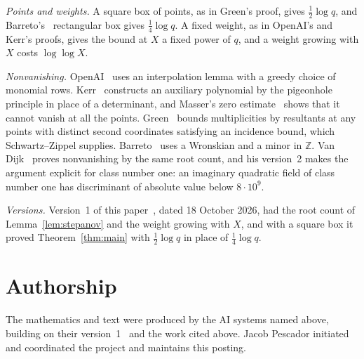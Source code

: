 \documentclass[11pt]{amsart}
\theoremstyle{remark}
\newcommand{\Z}{\mathbb{Z}}
\begin{document}
\emph{Points and weights.} A square box of points, as in Green's proof, gives $\frac12\log q$, and
Barreto's~\cite{Barreto} rectangular box gives $\frac14\log q$. A fixed weight, as in OpenAI's and Kerr's
proofs, gives the bound at $X$ a fixed power of $q$, and a weight growing with $X$ costs $\log\log X$.

\emph{Nonvanishing.} OpenAI~\cite{OpenAI} uses an interpolation lemma with a greedy choice of monomial rows.
Kerr~\cite{Kerr} constructs an auxiliary polynomial by the pigeonhole principle in place of a
determinant, and Masser's zero estimate~\cite{Masser} shows that it cannot vanish at all the points.
Green~\cite[Lemma~3.1]{Green} bounds multiplicities by resultants at any points with distinct
second coordinates satisfying an incidence bound, which Schwartz--Zippel supplies. Barreto~\cite{Barreto} uses a Wronskian and a minor in $\Z$. Van Dijk~\cite{vanDijk} proves nonvanishing by the same root count, and his version~2 makes
the argument explicit for class number one: an imaginary quadratic field of class number one has discriminant
of absolute value below $8\cdot10^9$.

\emph{Versions.} Version~1 of this paper~\cite{v1}, dated 18 October 2026, had the root count of Lemma~\ref{lem:stepanov} and the weight
growing with $X$, and with a square box it proved Theorem~\ref{thm:main} with $\frac12\log q$ in place of
$\frac14\log q$.

\section*{Authorship}
The mathematics and text were produced by the AI systems named above, building on their version~1~\cite{v1}
and the work cited above. Jacob Pescador initiated and coordinated the project and
maintains this posting.
\end{document}
